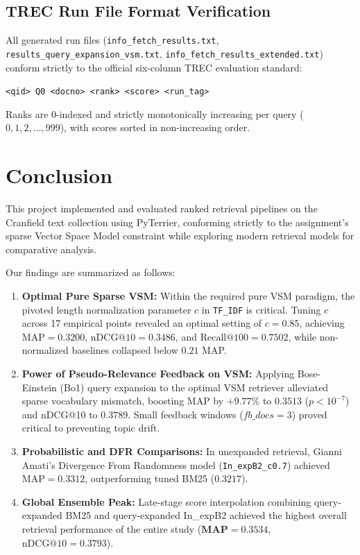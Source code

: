 \documentclass[10pt, a4paper]{article}
\begin{document}
\subsection{TREC Run File Format Verification}
All generated run files (\texttt{info\_fetch\_results.txt}, \texttt{results\_query\_expansion\_vsm.txt}, \texttt{info\_fetch\_results\_extended.txt}) conform strictly to the official six-column TREC evaluation standard:
\begin{center}
\texttt{<qid>  Q0  <docno>  <rank>  <score>  <run\_tag>}
\end{center}
Ranks are 0-indexed and strictly monotonically increasing per query ($0, 1, 2, \dots, 999$), with scores sorted in non-increasing order.

\section{Conclusion}
\label{sec:conclusion}

This project implemented and evaluated ranked retrieval pipelines on the Cranfield text collection using PyTerrier, conforming strictly to the assignment's sparse Vector Space Model constraint while exploring modern retrieval models for comparative analysis.

Our findings are summarized as follows:
\begin{enumerate}[noitemsep,topsep=2pt]
    \item \textbf{Optimal Pure Sparse VSM:} Within the required pure VSM paradigm, the pivoted length normalization parameter $c$ in \texttt{TF\_IDF} is critical. Tuning $c$ across 17 empirical points revealed an optimal setting of $c=0.85$, achieving $\text{MAP} = \mathbf{0.3200}$, $\text{nDCG@10} = \mathbf{0.3486}$, and $\text{Recall@100} = \mathbf{0.7502}$, while non-normalized baselines collapsed below $0.21$ MAP.
    \item \textbf{Power of Pseudo-Relevance Feedback on VSM:} Applying Bose-Einstein (Bo1) query expansion to the optimal VSM retriever alleviated sparse vocabulary mismatch, boosting MAP by $+9.77\%$ to $\mathbf{0.3513}$ ($p < 10^{-7}$) and nDCG@10 to $\mathbf{0.3789}$. Small feedback windows ($fb\_docs=3$) proved critical to preventing topic drift.
    \item \textbf{Probabilistic and DFR Comparisons:} In unexpanded retrieval, Gianni Amati's Divergence From Randomness model (\texttt{In\_expB2\_c0.7}) achieved $\text{MAP} = \mathbf{0.3312}$, outperforming tuned BM25 ($0.3217$).
    \item \textbf{Global Ensemble Peak:} Late-stage score interpolation combining query-expanded BM25 and query-expanded In\_expB2 achieved the highest overall retrieval performance of the entire study ($\mathbf{MAP = 0.3534}$, $\text{nDCG@10} = \mathbf{0.3793}$).
\end{enumerate}
\end{document}
